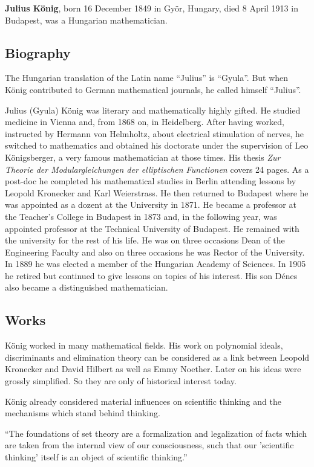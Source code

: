 \documentclass[12pt]{article}
\begin{document}
\textbf{Julius K\"onig}, born 16 December 1849 in Gy\"or, Hungary,
died 8 April 1913 in Budapest, was a Hungarian mathematician.

\subsection{Biography} 

The Hungarian translation of the Latin name ``Julius'' is
``Gyula''. But when K\"onig contributed to German mathematical
journals, he called himself ``Julius''.

Julius (Gyula) K\"onig was literary and mathematically highly
gifted. He studied medicine in Vienna and, from 1868 on, in
Heidelberg. After having worked, instructed by Hermann von Helmholtz,
about electrical stimulation of nerves, he switched to mathematics and
obtained his doctorate under the supervision of Leo K\"onigsberger, a
very famous mathematician at those times. His thesis \emph{Zur Theorie
der Modulargleichungen der elliptischen Functionen} covers 24
pages. As a post-doc he completed his mathematical studies in Berlin
attending lessons by Leopold Kronecker and Karl Weierstrass. He then
returned to Budapest where he was appointed as a dozent at the
University in 1871. He became a professor at the Teacher's College in
Budapest in 1873 and, in the following year, was appointed professor
at the Technical University of Budapest. He remained with the
university for the rest of his life. He was on three occasions Dean of
the Engineering Faculty and also on three occasions he was Rector of
the University.  In 1889 he was elected a member of the Hungarian
Academy of Sciences. In 1905 he retired but continued to give lessons
on topics of his interest. His son D\'enes also became a distinguished
mathematician.

\subsection{Works}

K\"onig worked in many mathematical fields. His work on polynomial
ideals, discriminants and elimination theory can be considered as a
link between Leopold Kronecker and David Hilbert as well as Emmy
Noether. Later on his ideas were grossly simplified. So they are only
of historical interest today.

K\"onig already considered material influences on scientific thinking
and the mechanisms which stand behind thinking.

``The foundations of set theory are a formalization and legalization
of facts which are taken from the internal view of our consciousness,
such that our 'scientific thinking' itself is an object of scientific
thinking.''
\end{document}

